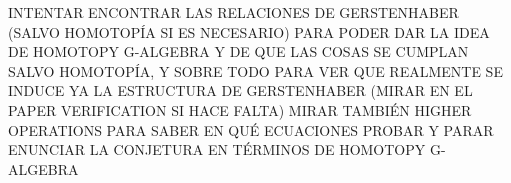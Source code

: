 \documentclass[TFM.tex]{subfiles}
\begin{document}
INTENTAR ENCONTRAR LAS RELACIONES DE GERSTENHABER (SALVO HOMOTOPÍA SI ES NECESARIO) PARA PODER DAR LA IDEA DE HOMOTOPY G-ALGEBRA Y DE QUE LAS COSAS SE CUMPLAN SALVO HOMOTOPÍA, Y SOBRE TODO PARA VER QUE REALMENTE SE INDUCE YA LA ESTRUCTURA DE GERSTENHABER (MIRAR EN EL PAPER VERIFICATION SI HACE FALTA) MIRAR TAMBIÉN HIGHER OPERATIONS PARA SABER EN QUÉ ECUACIONES PROBAR Y PARAR ENUNCIAR LA CONJETURA EN TÉRMINOS DE HOMOTOPY G-ALGEBRA
\end{document}
